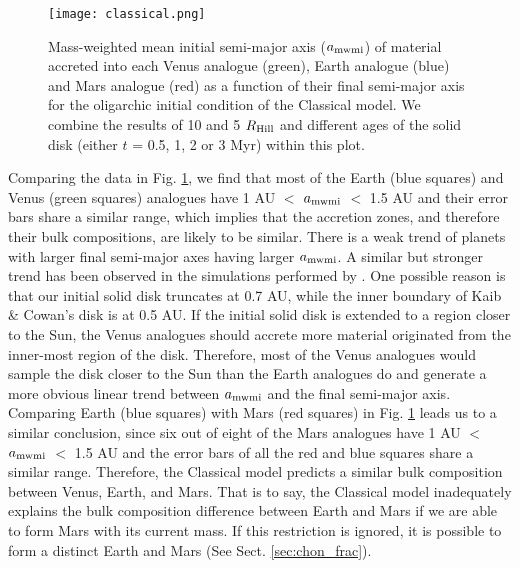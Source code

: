 \documentclass{aa}
\begin{document}
\begin{figure*}
\sidecaption
\texttt{[image: classical.png]}
\caption{Mass-weighted mean initial semi-major axis ($a_{\rm mwmi}$) of material accreted into each Venus analogue (green), Earth analogue (blue) and Mars analogue (red) as a function of their final semi-major axis for the oligarchic initial condition of the Classical model. We combine the results of 10 and 5 $R_{\rm Hill}$ and different ages of the solid disk (either $t$ = 0.5, 1, 2 or 3 Myr) within this plot.}
\label{fig:classical}

\end{figure*}


Comparing the data in Fig. \ref{fig:classical}, we find that most of the Earth (blue squares) and Venus (green squares) analogues have 1 AU $<$ $a_{\rm mwmi}$ $<$ 1.5 AU and their error bars share a similar range, which implies that the accretion zones, and therefore their bulk compositions, are likely to be similar. There is a weak trend of planets with larger final semi-major axes having larger $a_{\rm mwmi}$. A similar but stronger trend has been observed in the simulations performed by \cite{kaib2015feeding}. One possible reason is that our initial solid disk truncates at 0.7 AU, while the inner boundary of Kaib \& Cowan’s disk is at 0.5 AU. If the initial solid disk is extended to a region closer to the Sun, the Venus analogues should accrete more material originated from the inner-most region of the disk. Therefore, most of the Venus analogues would sample the disk closer to the Sun than the Earth analogues do and generate a more obvious linear trend between $a_{\rm mwmi}$ and the final semi-major axis. Comparing Earth (blue squares) with Mars (red squares) in Fig. \ref{fig:classical} leads us to a similar conclusion, since six out of eight of the Mars analogues have 1 AU $<$ $a_{\rm mwmi}$ $<$ 1.5 AU and the error bars of all the red and blue squares share a similar range. Therefore, the Classical model predicts a similar bulk composition between Venus, Earth, and Mars. That is to say, the Classical model inadequately explains the bulk composition difference between Earth and Mars if we are able to form Mars with its current mass. If this restriction is ignored, it is possible to form a distinct Earth and Mars (See Sect. \ref{sec:chon_frac}). 
\end{document}
